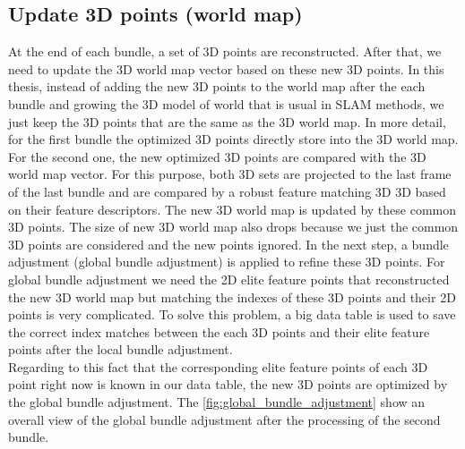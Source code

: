 \subsection{Update 3D points (world map)}
At the end of each bundle, a set of 3D points are reconstructed. After that, we need to update the 3D world map vector based on these new 3D points. In this thesis, instead of adding the new 3D points to the world map after the each bundle and growing the 3D model of world that is usual in SLAM methods, we just keep the 3D points that are the same as the 3D world map. In more detail, for the first bundle the optimized 3D points directly store into the 3D world map. For the second one, the new optimized 3D points are compared with the 3D world map vector. For this purpose, both 3D sets are projected to the last frame of the last bundle and are compared by a robust feature matching 3D 3D based on their feature descriptors. The new 3D world map is updated by these common 3D points. The size of new 3D world map also drops because we just the common 3D points are considered and the new points ignored.
In the next step, a bundle adjustment (global bundle adjustment) is applied to refine these 3D points. For global bundle adjustment we need the 2D elite feature points that reconstructed the new 3D world map but matching the indexes of these 3D points and their 2D points is very complicated. To solve this problem, a big data table is used to save the correct index matches between the each 3D points and their elite feature points after the local bundle adjustment.\\
Regarding to this fact that the corresponding elite feature points of each 3D point right now is known in our data table, the new 3D points are optimized by the global bundle adjustment. The \autoref{fig:global_bundle_adjustment} show an overall view of the global bundle adjustment after the processing of the second bundle.

